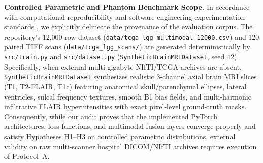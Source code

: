 \documentclass[conference]{IEEEtran}
\begin{document}
\textbf{Controlled Parametric and Phantom Benchmark Scope.} In accordance with computational reproducibility and software-engineering experimentation standards \cite{peng2011reproducible, wohlin2012experimentation}, we explicitly delineate the provenance of the evaluation corpus. The repository's 12,000-row dataset (\texttt{data/tcga\_lgg\_multimodal\_12000.csv}) and 120 paired TIFF scans (\texttt{data/tcga\_lgg\_scans/}) are generated deterministically by \texttt{src/train.py} and \texttt{src/dataset.py} (\texttt{SyntheticBrainMRIDataset}, seed $42$). Specifically, when external multi-gigabyte NIfTI/TCGA archives are absent, \texttt{SyntheticBrainMRIDataset} synthesizes realistic 3-channel axial brain MRI slices (T1, T2-FLAIR, T1c) featuring anatomical skull/parenchymal ellipses, lateral ventricles, sulcal frequency textures, smooth B1 bias fields, and multi-harmonic infiltrative FLAIR hyperintensities with exact pixel-level ground-truth masks. Consequently, while our audit proves that the implemented PyTorch architectures, loss functions, and multimodal fusion layers converge properly and satisfy Hypotheses H1--H3 on controlled parametric distributions, external validity on raw multi-scanner hospital DICOM/NIfTI archives requires execution of Protocol~A.
\end{document}
